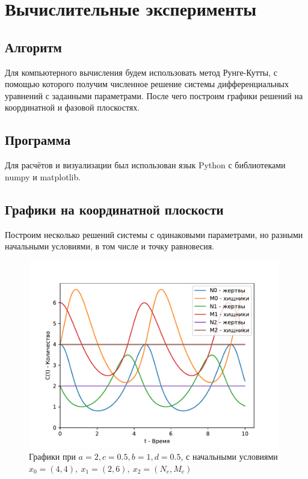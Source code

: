 \section{Вычислительные эксперименты}

    \subsection{Алгоритм}
        Для компьютерного вычисления будем использовать метод Рунге-Кутты, с помощью которого получим численное решение системы дифференциальных уравнений с заданными параметрами. После чего построим графики решений на координатной и фазовой плоскостях.


    \subsection{Программа}
        Для расчётов и визуализации был использован язык Python с библиотеками numpy и matplotlib.

        

    \subsection{Графики на координатной плоскости}
        Построим несколько решений системы с одинаковыми параметрами, но разными начальными условиями, в том числе и точку равновесия.

        \begin{figure}[H]
            \centering
            \includegraphics[width=11cm]{pictures/population.pdf}
            \caption{Графики при $a = 2, c = 0.5, b = 1, d = 0.5$, с начальными условиями $x_0=(4,4), ~ x_1 = (2,6), ~ x_2 = (N_e, M_e)$}
        \end{figure}

